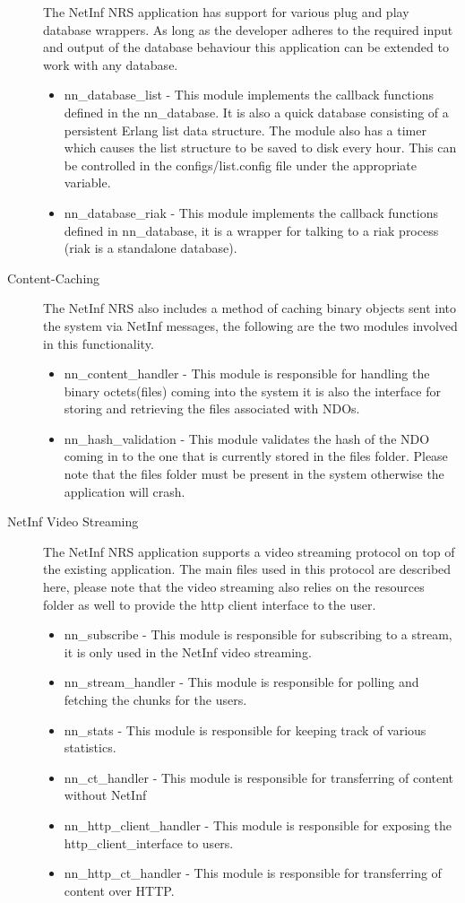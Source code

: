 \begin{description}
The NetInf NRS application has support for various plug and play database wrappers. As long as the developer adheres to the required input and output of the database behaviour this application can be extended to work with any database. 
\begin{itemize}
\item nn\_database\_list - This module implements the callback functions defined in the nn\_database. It is also a quick database consisting of a persistent Erlang list data structure. The module also has a timer which causes the list structure to be saved to disk every hour. This can be controlled in the configs/list.config file under the appropriate variable.
\item nn\_database\_riak - This module implements the callback functions defined in nn\_database, it is a wrapper for talking to a riak process (riak is a standalone database).
\end{itemize}
\item[Content-Caching]
The NetInf NRS also includes a method of caching binary objects sent into the system via NetInf messages, the following are the two modules involved in this functionality.
\begin {itemize}
\item nn\_content\_handler - This module is responsible for handling the binary octets(files) coming into the system it is also the interface for storing and retrieving the files associated with NDOs.
\item nn\_hash\_validation - This module validates the hash of the NDO coming in to the one that is currently stored in the files folder. Please note that the files folder must be present in the system otherwise the application will crash. 
\end{itemize}
\item[NetInf Video Streaming]
The NetInf NRS application supports a video streaming protocol on top of the existing application. The main files used in this protocol are described here, please note that the video streaming also relies on the resources folder as well to provide the http client interface to the user. 

\begin{itemize}
\item nn\_subscribe - This module is responsible for subscribing to a stream, it is only used in the NetInf video streaming.
\item nn\_stream\_handler - This module is responsible for polling and fetching the chunks for the users.
\item nn\_stats - This module is responsible for keeping track of various statistics.
\item nn\_ct\_handler - This module is responsible for transferring of content without NetInf
\item nn\_http\_client\_handler - This module is responsible for exposing the http\_client\_interface to users.
\item nn\_http\_ct\_handler - This module is responsible for transferring of content over HTTP.
\end{itemize}


\end{description}
